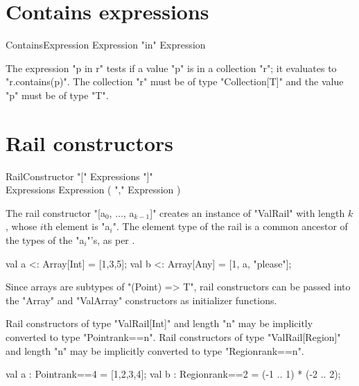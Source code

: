 \section{Contains expressions}

\begin{grammar}
ContainsExpression \: Expression \xcd"in" Expression \\
\end{grammar}

The expression \xcd"p in r" tests if a value \xcd"p" is in a collection
\xcd"r"; it evaluates to \xcd"r.contains(p)".
The collection \xcd"r"
must be of type \xcd"Collection[T]" and the value \xcd"p" must
be of type \xcd"T".

\section{Rail constructors}
\label{RailConstructors}

\begin{grammar}
RailConstructor \: \xcd"[" Expressions \xcd"]" \\
Expressions \: Expression ( \xcd"," Expression )\star \\
\end{grammar}

The rail constructor \xcdmath"[a$_0$, $\dots$, a$_{k-1}$]"
creates an instance of \xcd"ValRail" with length $k$, 
whose $i$th element is
\xcdmath"a$_i$".  The element type of the rail is a common ancestor of the
types of the \xcdmath"a$_i$"'s, as per .
\begin{xten}
val a <: Array[Int] = [1,3,5];
val b <: Array[Any] = [1, a, "please"];
\end{xten}

Since arrays are subtypes of \xcd"(Point) => T",
rail constructors can be passed into the \xcd"Array" and
\xcd"ValArray" constructors as initializer functions.

Rail constructors of type \xcd"ValRail[Int]" and length \xcd"n" 
may be implicitly converted to type \xcd"Point{rank==n}".
Rail constructors of type \xcd"ValRail[Region]" and length \xcd"n" 
may be implicitly converted to type \xcd"Region{rank==n}".

\begin{xten}
val a : Point{rank==4} = [1,2,3,4];
val b : Region{rank==2} = (-1 .. 1) * (-2 .. 2);
\end{xten}


